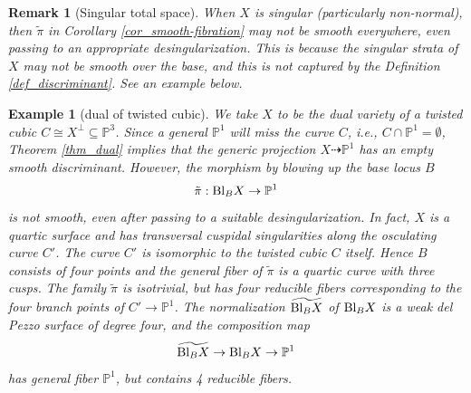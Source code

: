 \documentclass[12pt]{amsart}
\newcommand{\Bl}{\textup{Bl}}
\newtheorem{example}[theorem]{Example}
\newtheorem{remark}[theorem]{Remark}
\begin{document}
 
\begin{remark}[Singular total space]\normalfont \label{remark_twistedcubicdual}
  When $X$ is singular (particularly non-normal), then $\tilde{\pi}$ in Corollary \ref{cor_smooth-fibration} may not be smooth everywhere, %
    even passing to an appropriate desingularization. This is because the singular strata of $X$ may not be smooth over the base, and this is not captured by the Definition \ref{def_discriminant}. See an example below.%
 
\end{remark}
\begin{example}[dual of twisted cubic]\normalfont\label{example_dual-twisted-cubic}
        We take $X$ to be the dual variety of a twisted cubic $C\cong X^{\perp}\subseteq \mathbb P^3$.     Since a general $\mathbb P^1$ will miss the curve $C$, i.e., $C\cap \mathbb P^1=\emptyset$, Theorem \ref{thm_dual} implies that the generic projection $X\dashrightarrow\mathbb P^1$ has an empty smooth discriminant. However, the morphism by blowing up the base locus $B$
$$\tilde{\pi}:\textup{Bl}_{B}X\to \mathbb P^1$$
is not smooth, even after passing to a suitable desingularization. In fact,  $X$ is a quartic surface and has transversal cuspidal singularities along the osculating curve $C'$. The curve $C'$ is isomorphic to the twisted cubic $C$ itself. Hence $B$ consists of four points and the general fiber of $\tilde{\pi}$ is a quartic curve with three cusps. The family $\tilde{\pi}$ is isotrivial, but has four reducible fibers corresponding to the four branch points of $C'\to \mathbb P^1$. The normalization $\widetilde{\Bl_BX}$ of $\Bl_BX$ is a weak del Pezzo surface of degree four, and the composition map 
$$\widetilde{\Bl_BX}\to \Bl_BX\to \mathbb P^1$$
has general fiber $\mathbb P^1$, but contains 4 reducible fibers.
\end{example}



\end{document}
